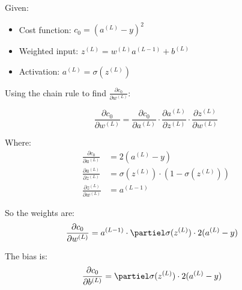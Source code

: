\documentclass{article}
\begin{document}
Given:
\begin{itemize}
    \item Cost function: \(c_0 = (a^{(L)} - y)^2\)
    \item Weighted input: \(z^{(L)} = w^{(L)} a^{(L-1)} + b^{(L)}\)
    \item Activation: \(a^{(L)} = \sigma(z^{(L)})\)
\end{itemize}

Using the chain rule to find \(\frac{\partial c_0}{\partial w^{(L)}}\):

\[
\frac{\partial c_0}{\partial w^{(L)}} = \frac{\partial c_0}{\partial a^{(L)}} \cdot \frac{\partial a^{(L)}}{\partial z^{(L)}} \cdot \frac{\partial z^{(L)}}{\partial w^{(L)}}
\]

Where:
\begin{align*}
    \frac{\partial c_0}{\partial a^{(L)}} &= 2(a^{(L)} - y) \\
    \frac{\partial a^{(L)}}{\partial z^{(L)}} &= \sigma(z^{(L)}) \cdot (1 - \sigma(z^{(L)})) \\
    \frac{\partial z^{(L)}}{\partial w^{(L)}} &= a^{(L-1)}
\end{align*}


So the weights are:
\begin{align*}
    \frac{\partial c_0}{\partial w^{(L)}} &= a^{(L-1)} \cdot \partiel \sigma(z^{(L)}) \cdot 2(a^{(L)} - y)
\end{align*}

The bias is:
\begin{align*}
    \frac{\partial c_0}{\partial b^{(L)}} &= \partiel \sigma(z^{(L)}) \cdot 2(a^{(L)} - y)
\end{align*}
\end{document}
